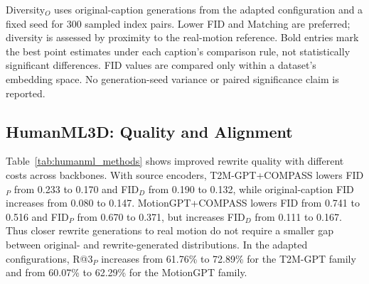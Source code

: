 Diversity$_O$ uses original-caption generations from the adapted configuration
and a fixed seed for 300 sampled index pairs. Lower FID and Matching are
preferred; diversity is assessed by proximity to the real-motion reference.
Bold entries mark the best point estimates under each caption's comparison
rule, not statistically significant differences. FID values are compared only
within a dataset's embedding space. No generation-seed variance or paired
significance claim is reported.

\subsection{HumanML3D: Quality and Alignment}
\begin{table}[t]
\centering
\caption{Motion-X on 7,679 fixed prompt pairs with a shared evaluator, CFG=1.3. FID variants use source encoders; other columns use adapted encoders. Bold marks the within-family best as in Table~\ref{tab:humanml_methods}; real diversity is 14.322.}
\label{tab:motionx_methods}
\resulttablesetup

\end{table}
Table~\ref{tab:humanml_methods} shows improved rewrite quality with different
costs across backbones. With source encoders, T2M-GPT+COMPASS lowers FID$_P$
from 0.233 to 0.170 and FID$_D$ from 0.190 to 0.132, while original-caption
FID increases from 0.080 to 0.147. MotionGPT+COMPASS lowers FID from 0.741
to 0.516 and FID$_P$ from 0.670 to 0.371, but increases FID$_D$ from 0.111
to 0.167. Thus closer rewrite generations to real motion do not require a
smaller gap between original- and rewrite-generated distributions.
In the adapted configurations, R@3$_P$ increases from 61.76\% to 72.89\%
for the T2M-GPT family and from 60.07\% to 62.29\% for the MotionGPT family.

